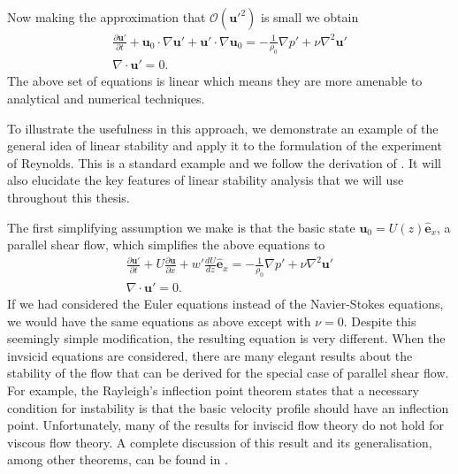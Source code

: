 Now making the approximation that $\mathcal{O}(\bm{u}'^{2})$ is small we obtain
\begin{align}
\frac{\partial \bm{u}'}{\partial t} + \bm{u}_{0}\cdot\nabla \bm{u}' + \bm{u}'\cdot\nabla\bm{u}_{0} =  -\frac{1}{\rho_{0}}\nabla p' + \nu\nabla^{2}\bm{u}'\\
 \nabla \cdot \bm{u}'=0.
\end{align}
The above set of equations is linear which means they are more amenable to analytical and numerical techniques. 

To illustrate the usefulness in this approach, we demonstrate an example of the general idea of linear stability and apply it to the formulation of the experiment of Reynolds. This is a standard example and we follow the derivation of \cite{drazinreid}. It will also elucidate the key features of linear stability analysis that we will use throughout this thesis.

The first simplifying assumption we make is that the basic state $\bm{u}_{0}=U(z)\hat{\bm{e}}_{x}$, a parallel shear flow, which simplifies the above equations to
\begin{align}
\frac{\partial \bm{u}'}{\partial t} + U\frac{\partial \bm{u}}{\partial x} + w'\frac{dU}{dz}\hat{\bm{e}}_{x}= -\frac{1}{\rho_{0}}\nabla p' + \nu\nabla^{2} \bm{u}'\\
\nabla \cdot\bm{u}'=0.
\end{align}
If we had considered the Euler equations instead of the Navier-Stokes equations, we would have the same equations as above except with $\nu=0$. Despite this seemingly simple modification, the resulting equation is very different. When the invsicid equations are considered, there are many elegant results about the stability of the flow that can be derived for the special case of parallel shear flow. For example, the Rayleigh's inflection point theorem states that a necessary condition for instability is that the basic velocity profile should have an inflection point\cite{drazinreid}. Unfortunately, many of the results for inviscid flow theory do not hold for viscous flow theory. A complete discussion of this result and its generalisation, among other theorems, can be found in \cite{drazinreid,kundu}.


